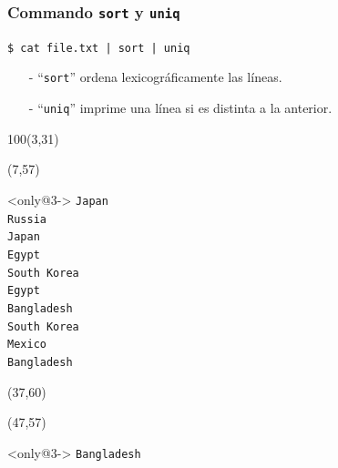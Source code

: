 \documentclass{beamer}
\begin{document}
\begin{frame}[fragile,t]
    \frametitle{Commando \texttt{sort} y \texttt{uniq}}
    \vspace{-0.5cm}
    \begin{block}{\vspace*{-3ex}}
    \texttt{\$}\verb: cat file.txt | sort | uniq:
    \vspace*{0.5ex}
    \end{block}
    \vspace{-0.2cm}
    \begin{itemize}
    \item[-] ``\verb|sort|'' ordena lexicográficamente las líneas.
    \item[-] ``\verb|uniq|'' imprime una línea si es distinta a la anterior.
    \end{itemize}
    \begin{textblock}{100}(3,31)
    \begin{center}
    \end{center}
    \end{textblock}
    \begin{textblock}{35}(7,57)
    \begin{block}<only@3->{\vspace*{-3ex}}
    \scriptsize
    \verb:Japan:\\
    \verb:Russia:\\
    \verb:Japan:\\
    \verb:Egypt:\\
    \verb:South Korea:\\
    \verb:Egypt:\\
    \verb:Bangladesh:\\
    \verb:South Korea:\\
    \verb:Mexico:\\
    \verb:Bangladesh:\\
    \vspace*{0.5ex}
    \end{block}
    \end{textblock}
    \begin{textblock}{35}(37,60)
    \end{textblock}
    \begin{textblock}{35}(47,57)
    \begin{block}<only@3->{\vspace*{-3ex}}
    \scriptsize
    \verb:Bangladesh:\\

\end{block}
\end{textblock}
\end{frame}
\end{document}
